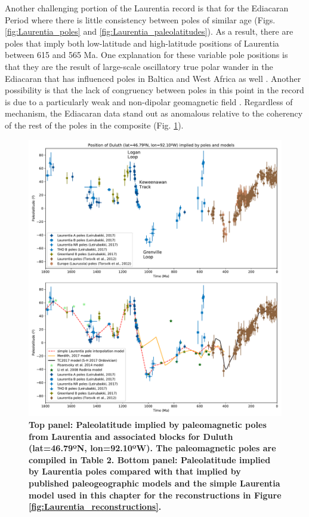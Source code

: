 \documentclass[11pt,letterpaper]{article}
\begin{document}
Another challenging portion of the Laurentia record is that for the Ediacaran Period where there is little consistency between poles of similar age (Figs. \ref{fig:Laurentia_poles} and \ref{fig:Laurentia_paleolatitudes}). As a result, there are poles that imply both low-latitude and high-latitude positions of Laurentia between 615 and 565 Ma. One explanation for these variable pole positions is that they are the result of large-scale oscillatory true polar wander in the Ediacaran that has influenced poles in Baltica and West Africa as well \citep{McCausland2007a, Robert2017a}. Another possibility is that the lack of congruency between poles in this point in the record is due to a particularly weak and non-dipolar geomagnetic field \citep{Abrajevitch2010a, Bono2019a}. Regardless of mechanism, the Ediacaran data stand out as anomalous relative to the coherency of the rest of the poles in the composite (Fig. \ref{fig:Laurentia_paleolatitude}).

\begin{figure}
\centering
\includegraphics[width=\textwidth]{../Figures/Laurentia_paleolatitude.pdf}
\caption{\small{\textbf{Top panel: Paleolatitude implied by paleomagnetic poles from Laurentia and associated blocks for Duluth (lat=46.79ºN, lon=92.10ºW). The paleomagnetic poles are compiled in Table 2. Bottom panel: Paleolatitude implied by Laurentia poles compared with that implied by published paleogeographic models and the simple Laurentia model used in this chapter for the reconstructions in Figure \ref{fig:Laurentia_reconstructions}.}}}
\label{fig:Laurentia_paleolatitude}
\end{figure} 
\end{document}
